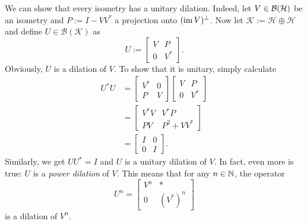 \begin{example}\label{ex:7.1}
    We can show that every isometry has a unitary dilation. 
    Indeed, let $V \in \operatorname{\mathcal{B} (\mathcal{H})}$ be an isometry and $P := I - V V^*$
    a projection onto $(\operatorname{im} V)^\perp$. Now let $\mathcal{K} := \mathcal{H} \oplus \mathcal{H}$ and 
    define $U \in \mathcal{B}(\mathcal{K})$ as 
    $$U := \begin{bmatrix}
        V & P\\
        0 & V^*
    \end{bmatrix}.$$
    Obviously, $U$ is a dilation of $V$. To show that it is unitary, simply calculate 
    \begin{align*}
        U^* U &= \begin{bmatrix}
            V^* & 0\\
            P & V
        \end{bmatrix} \begin{bmatrix}
            V & P\\
            0 & V^*
        \end{bmatrix}\\
        &= \begin{bmatrix}
            V^* V &  V^* P\\
            PV & P^2 + V V^*
        \end{bmatrix}\\
        &= \begin{bmatrix}
            I & 0\\
            0 & I
        \end{bmatrix}.
    \end{align*}
    Similarly, we get $U U^* = I$ and $U$ is a unitary dilation of $V$. In fact, even more is true:
    $U$ is a \emph{power dilation} of $V$. This means that for any $n \in \mathbb {N}$, the operator 
    $$U^n = \begin{bmatrix}
        V^n & *\\
        0 & (V^*) ^n
    \end{bmatrix}$$
    is a dilation of $V^n$.
\end{example}

